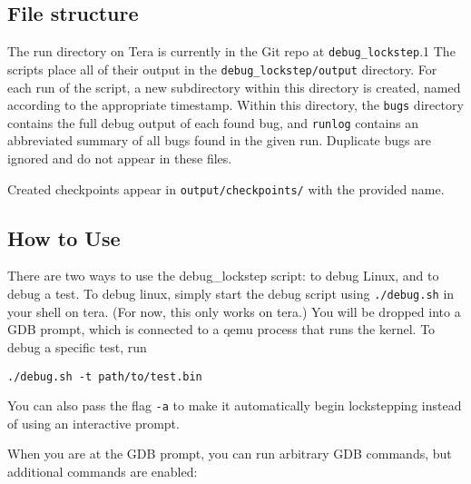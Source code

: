 \subsection{File structure}
The run directory on Tera is currently in the Git repo at \texttt{debug\_lockstep}.1 The scripts place all of their output in the \texttt{debug\_lockstep/output} directory. For each run of the script, a new subdirectory within this directory is created, named according to the appropriate timestamp. Within this directory, the \texttt{bugs} directory contains the full debug output of each found bug, and \texttt{runlog} contains an abbreviated summary of all bugs found in the given run. Duplicate bugs are ignored and do not appear in these files.

Created checkpoints appear in \texttt{output/checkpoints/} with the provided name.

\subsection{How to Use}
There are two ways to use the debug\_lockstep script: to debug Linux, and to debug a test. To debug linux, simply start the debug script using \texttt{./debug.sh} in your shell on tera. (For now, this only works on tera.) You will be dropped into a GDB prompt, which is connected to a qemu process that runs the kernel. To debug a specific test, run

\begin{verbatim}
./debug.sh -t path/to/test.bin
\end{verbatim}

You can also pass the flag \texttt{-a} to make it automatically begin lockstepping instead of using an interactive prompt.

When you are at the GDB prompt, you can run arbitrary GDB commands, but additional commands are enabled:

